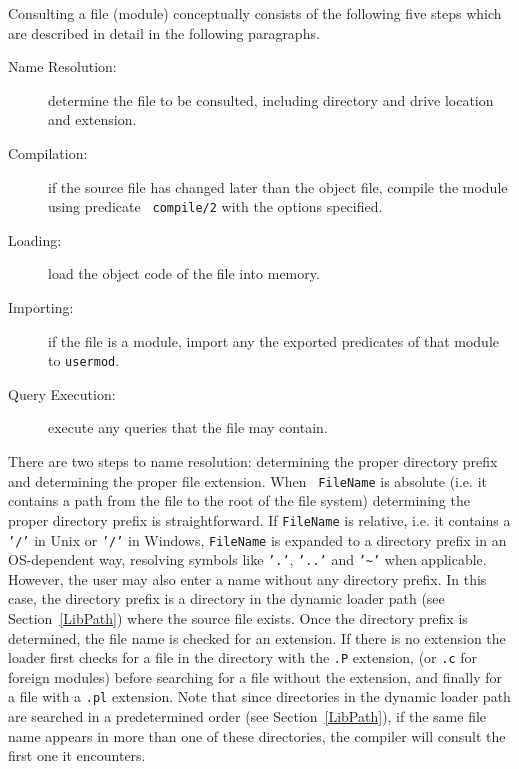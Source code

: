 Consulting a file (module) conceptually consists of the following five
steps which are described in detail in the following paragraphs.
\begin{description}
\item[Name Resolution:] determine the file to be consulted, including
	directory and drive location and extension.
\item[Compilation:]  if the source file has changed later than the
	object file, compile the module using predicate {\tt
            compile/2} with the options specified.
\item[Loading:] load the object code of the file into memory. 
\item[Importing:] if the file is a module, import any the exported
	predicates of that module to {\tt usermod}.
\item[Query Execution:] execute any queries that the file may contain.
\end{description}

There are two steps to name resolution: determining the proper
directory prefix and determining the proper file extension.  When {\tt
FileName} is absolute (i.e. it contains a path from the file to the
root of the file system) determining the proper directory prefix is
straightforward.  If {\tt FileName} is relative, i.e. it contains a
{\tt '/'} in Unix or {\tt '/'} in Windows, {\tt FileName} is expanded
to a directory prefix in an OS-dependent way, resolving symbols like
{\tt '.'}, {\tt '..'} and {\tt '\~{}'} when applicable.  However, the
user may also enter a name without any directory prefix. In this case,
the directory prefix is a directory in the dynamic loader path (see
Section~\ref{LibPath}) where the source file exists.  Once the
directory prefix is determined, the file name is checked for an
extension.  If there is no extension the loader first checks for a
file in the directory with the {\tt .P} extension, (or {\tt .c} for
foreign modules) before searching for a file without the extension,
and finally for a file with a {\tt .pl} extension.  Note that since
directories in the dynamic loader path are searched in a predetermined
order (see Section~\ref{LibPath}), if the same file name appears in
more than one of these directories, the compiler will consult the
first one it encounters.

